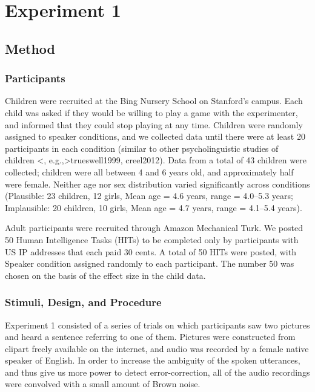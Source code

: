 \documentclass[man,floatsintext]{apa6}
\begin{document}
\section{Experiment 1}

\subsection{Method}
\subsubsection{Participants}

Children were recruited at the Bing Nursery School on Stanford's campus. Each child was asked if they would be willing to play a game with the experimenter, and informed that they could stop playing at any time. Children were randomly assigned to speaker conditions, and we collected data until there were at least 20 participants in each condition (similar to other psycholinguistic studies of children \citeNP<, e.g.,>{trueswell1999, creel2012}). Data from a total of 43 children were collected; children were all between 4 and 6 years old, and approximately half were female. Neither age nor sex distribution varied significantly across conditions (Plausible: 23 children, 12 girls, Mean age = 4.6 years, range = 4.0--5.3 years; Implausible: 20 children, 10 girls, Mean age = 4.7 years, range = 4.1--5.4 years).

Adult participants were recruited through Amazon Mechanical Turk. We posted 50 Human Intelligence Tasks (HITs) to be completed only by participants with US IP addresses that each paid 30 cents. A total of 50 HITs were posted, with Speaker condition assigned randomly to each participant. The number 50 was chosen on the basis of the effect size in the child data.

\subsubsection{Stimuli, Design, and Procedure}

Experiment 1 consisted of a series of trials on which participants saw two pictures and heard a sentence referring to one of them. Pictures were constructed from clipart freely available on the internet, and audio was recorded by a female native speaker of English. In order to increase the ambiguity of the spoken utterances, and thus give us more power to detect error-correction, all of the audio recordings were convolved with a small amount of Brown noise.
\end{document}
